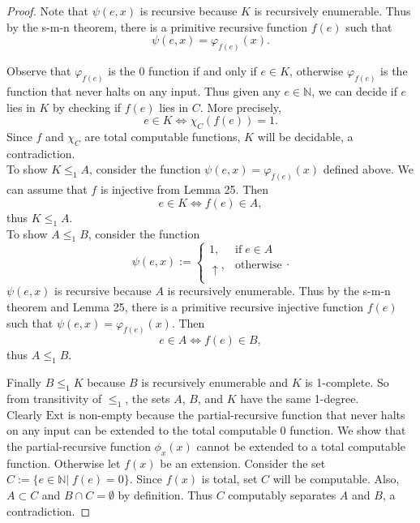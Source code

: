 \documentclass{article}
\begin{document}
\begin{enumerate}[label={\bf Q\arabic*:}]
\begin{proof}
      Note that $\psi(e,x)$ is recursive because $K$ is recursively
      enumerable. Thus by the s-m-n theorem, there is a primitive
      recursive function $f(e)$ such that
      \[\psi(e,x)=\varphi_{f(e)}(x).\]

      Observe that $\varphi_{f(e)}$ is the 0 function if and only if $e\in
      K$, otherwise $\varphi_{f(e)}$ is the function that never halts on
      any input. Thus given any $e\in\mathbb{N}$, we can decide if $e$ lies
      in $K$ by checking if $f(e)$ lies in $C$. More precisely,
      \[e\in K \Leftrightarrow \chi_C(f(e))=1.\]
      Since $f$ and $\chi_C$ are total computable functions, $K$ will be
      decidable, a contradiction. \\

      To show $K\leq_1A$, consider the function
      $\psi(e,x)=\varphi_{f(e)}(x)$ defined above. We can assume that $f$
      is injective from Lemma 25. Then
      \[e\in K \Leftrightarrow f(e)\in A,\]
      thus $K\leq_1A$. \\

      To show $A\leq_1B$, consider the function
      \begin{equation*}
        \psi(e,x) :=
        \begin{cases}
          1, &\text{if}\; e\in A\\
          \uparrow, &\text{otherwise}\\
        \end{cases}.
      \end{equation*}
      $\psi(e,x)$ is recursive because $A$ is recursively enumerable. Thus
      by the s-m-n theorem and Lemma 25, there is a primitive recursive
      injective function $f(e)$ such that $\psi(e,x)=\varphi_{f(e)}(x)$.
      Then
      \[e\in A \Leftrightarrow f(e)\in B,\]
      thus $A\leq_1B$.

      Finally $B\leq_1K$ because $B$ is recursively enumerable and $K$ is
      1-complete. So from transitivity of $\leq_1$, the sets $A$, $B$, and
      $K$ have the same 1-degree. \\

      Clearly $\text{Ext}$ is non-empty because the partial-recursive
      function that never halts on any input can be extended to the
      total computable 0 function. We show that the partial-recursive
      function $\phi_x(x)$ cannot be extended to a total computable
      function. Otherwise let $f(x)$ be an extension. Consider the set
      $C:=\{e\in\mathbb{N}|\; f(e)=0\}$. Since $f(x)$ is total, set $C$
      will be computable. Also, $A\subset C$ and $B\cap C=\emptyset$ by
      definition. Thus $C$ computably separates $A$ and $B$, a
      contradiction.
    \end{proof}


\end{enumerate}
\end{document}
